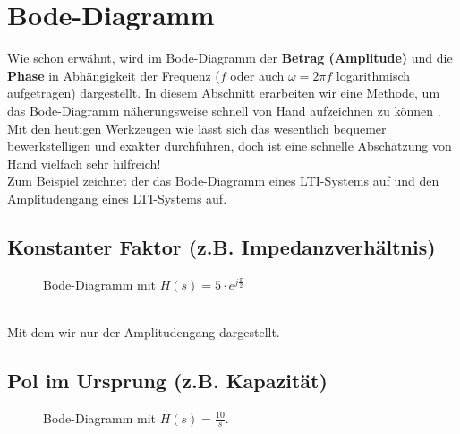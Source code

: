 {\section{Bode-Diagramm}
Wie schon erw\"ahnt, wird im Bode-Diagramm der {\bf Betrag
  (Amplitude)} und die {\bf
  Phase} in Abh\"angigkeit der Frequenz ($f$ oder auch $\omega=2\pi f$ logarithmisch
aufgetragen) dargestellt. In diesem Abschnitt erarbeiten wir eine
Methode, um das Bode-Diagramm n\"aherungsweise schnell von Hand
aufzeichnen zu k\"onnen \cite{FRE:BOS:04}.\\ \nit Mit den heutigen Werkzeugen wie
\matlogo{} l\"asst sich das wesentlich
bequemer bewerkstelligen und exakter durchf\"uhren, doch ist eine
schnelle Absch\"atzung von Hand vielfach sehr hilfreich!\\
Zum Beispiel zeichnet der  das Bode-Diagramm eines LTI-Systems auf und  den Amplitudengang eines LTI-Systems auf.


\subsection{Konstanter Faktor (z.B. Impedanzverh\"altnis)}\label{F_VER_BODE_faktor}
\begin{figure}[!htb]%
\vspace*{-8mm}
\begin{center}
  \vspace*{-3mm}\caption{Bode-Diagramm mit $H(s)=5\cdot e^{j\frac{\pi}{2}}$}
\end{center}
\vspace*{-6mm}
\end{figure}~\\

\nit Mit dem  wir nur der Amplitudengang dargestellt.
\newpage

\subsection{Pol im Ursprung (z.B. Kapazit\"at)}
\vspace*{-5mm}
\begin{figure}[!htb]%
\vspace*{-4mm}
\begin{center}
  \vspace*{-3mm}\caption{Bode-Diagramm mit $H(s)=\frac{10}{s}$.}
\end{center}
\vspace*{-6mm}
\end{figure}


}
